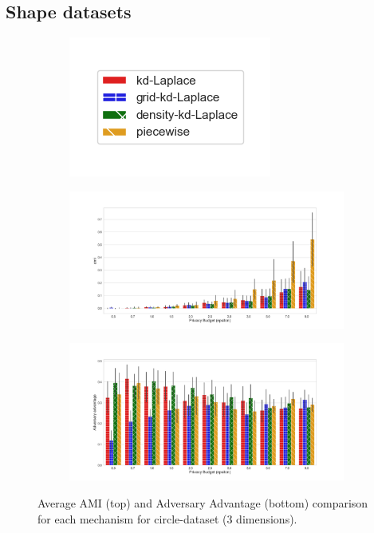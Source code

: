 \subsection{Shape datasets}

\begin{figure}[H]
  \centering
  \begin{subfigure}{0.30\textwidth}
    \includegraphics[width=\textwidth]{Results/kd-laplace/ami_bar_comparison_legend.png}
  \end{subfigure}
  \begin{subfigure}{1\textwidth}
    \includegraphics[width=1\textwidth]{Results/kd-laplace/ami_circle-dataset_comparison.png}
  \end{subfigure}
  \begin{subfigure}{1\textwidth}
    \includegraphics[width=1\textwidth]{Results/kd-laplace/shokri_mi_adv_circle-dataset_comparison.png}
  \end{subfigure}
  \caption{Average AMI (top) and Adversary Advantage (bottom) comparison for each mechanism for circle-dataset (3 dimensions).}
  \label{fig:utility_circle-dataset_comparison_nd_plot}
\end{figure}
